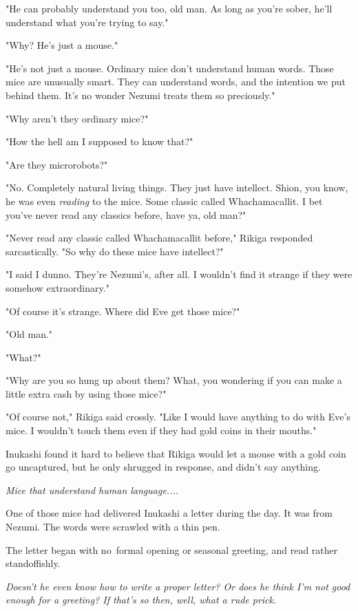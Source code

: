 "He can probably understand you too, old man. As long as you're sober,
he'll understand what you're trying to say."

"Why? He's just a mouse."

"He's not just a mouse. Ordinary mice don't understand human words.
Those mice are unusually smart. They can understand words, and the
intention we put behind them. It's no wonder Nezumi treats them so
preciously."

"Why aren't they ordinary mice?"

"How the hell am I supposed to know that?"

"Are they microrobots?"

"No. Completely natural living things. They just have intellect. Shion,
you know, he was even \emph{reading} to the mice. Some classic called
Whachamacallit. I bet you've never read any classics before, have ya,
old man?"

"Never read any classic called Whachamacallit before," Rikiga responded
sarcastically. "So why do these mice have intellect?"

"I said I dunno. They're Nezumi's, after all. I wouldn't find it strange
if they were somehow extraordinary."

"Of course it's strange. Where did Eve get those mice?"

"Old man."

"What?"

"Why are you so hung up about them? What, you wondering if you can make
a little extra cash by using those mice?"

"Of course not," Rikiga said crossly. "Like I would have anything to do
with Eve's mice. I wouldn't touch them even if they had gold coins in
their mouths."

Inukashi found it hard to believe that Rikiga would let a mouse with a
gold coin go uncaptured, but he only shrugged in response, and didn't
say anything.

\emph{Mice that understand human language....}

One of those mice had delivered Inukashi a letter during the day. It was
from Nezumi. The words were scrawled with a thin pen.


The letter began with no~formal opening or seasonal greeting, and read
rather standoffishly.

\emph{Doesn't he even know how to write a proper letter? Or does he think I'm
not good enough for a greeting? If that's so then, well, what a rude
prick.}

